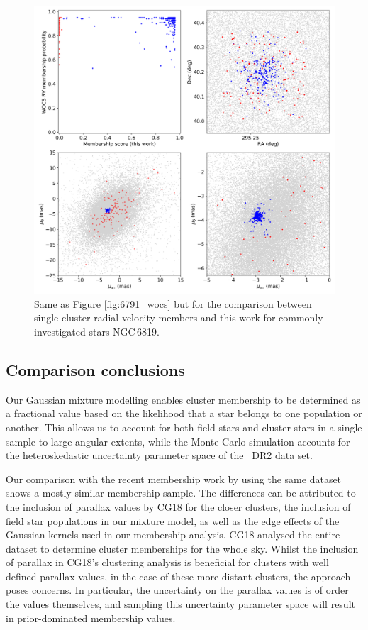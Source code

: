 \begin{figure}[hbtp]
    \centering
    \includegraphics[width=0.98\linewidth]{Chapter4/wocs_com_6819.png}
    \caption[Comparison with WOCS RV members for NGC\,6819]{Same as Figure \ref{fig:6791_wocs} but for the comparison between \cite{hole_wiyn_2009} single cluster radial velocity members and this work for commonly investigated stars NGC\,6819.}
    \label{fig:6819_wocs}
\end{figure}

\subsection{Comparison conclusions}

Our Gaussian mixture modelling enables cluster membership to be determined as a fractional value based on the likelihood that a star belongs to one population or another. This allows us to account for both field stars and cluster stars in a single sample to large angular extents, while the Monte-Carlo simulation accounts for the heteroskedastic uncertainty parameter space of the \Gaia~DR2 data set.

Our comparison with the recent membership work by \cite{cantat-gaudin_gaia_2018} using the same dataset shows a mostly similar membership sample. The differences can be attributed to the inclusion of parallax values by CG18 for the closer clusters, the inclusion of field star populations in our mixture model, as well as the edge effects of the Gaussian kernels used in our membership analysis. CG18 analysed the entire \Gaia{} dataset to determine cluster memberships for the whole sky. Whilst the inclusion of parallax in CG18's clustering analysis is beneficial for clusters with well defined parallax values, in the case of these more distant clusters, the approach poses concerns. In particular, the uncertainty on the parallax values is of order the values themselves, and sampling this uncertainty parameter space will result in prior-dominated membership values. 

